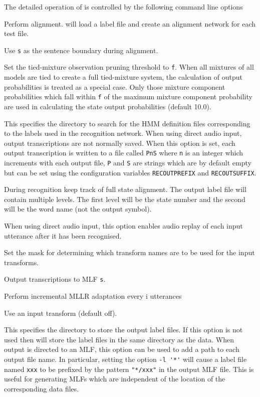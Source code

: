 The detailed operation of  is controlled by the following
command line options
\begin{optlist}

   Perform alignment.   will load a label file and
        create an alignment network for each test file.

   Use \texttt{s} as the sentence boundary during alignment.
  
   Set the tied-mixture observation pruning threshold to \texttt{f}.
        When all mixtures of all models are tied to create a full
        tied-mixture system, the calculation of output probabilities
        is treated as a special case.  Only those mixture 
        component probabilities which fall within \texttt{f} of
        the maximum mixture component probability are used in calculating
        the state output probabilities (default 10.0).

   This specifies the directory to search for the
        HMM definition files corresponding to the labels used in
        the recognition network.
   When using direct audio input, output transcriptions
        are not normally saved.  When this option is set, each
        output transcription is written to a file called \texttt{PnS}
        where \texttt{n} is an integer which increments with each output
        file, \texttt{P} and \texttt{S} are strings which are by default
        empty but can be set using the configuration variables
        \texttt{RECOUTPREFIX} and \texttt{RECOUTSUFFIX}.

 During recognition keep track of full state alignment. The output
        label file will contain multiple levels. The first level will be the 
        state number and the second will be the word name (not the output symbol).

   When using direct audio input, this option enables audio
        replay of each input utterance after it has been recognised.

   Set the mask for determining which transform names are 
	to be used for the input transforms. 

   Output transcriptions to MLF \texttt{s}.

   Perform incremental MLLR adaptation every i utterances      

   Use an input transform (default off).

   This specifies the directory to store the  output label 
        files.  If this option is not used then  will store 
        the label files in the same directory as the data.
      When output is directed to an MLF, this option can be used to
      add a path to each output file name.  In particular, setting the option
      \verb+-l '*'+ will cause a label file named \texttt{xxx} to be prefixed
      by the pattern \verb+"*/xxx"+ in the output MLF file.  This is useful
      for generating MLFs which are independent of the location of the 
      corresponding data files.


\end{optlist}
